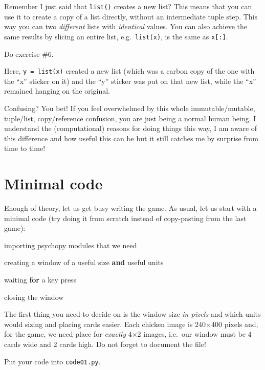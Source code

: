 \documentclass[
]{book}
\newenvironment{Shaded}{\begin{snugshade}}{\end{snugshade}}
\newcommand{\ControlFlowTok}[1]{\textcolor[rgb]{0.13,0.29,0.53}{\textbf{#1}}}
\newcommand{\KeywordTok}[1]{\textcolor[rgb]{0.13,0.29,0.53}{\textbf{#1}}}
\newcommand{\NormalTok}[1]{#1}
\begin{document}
Remember I just said that \texttt{list()} creates a new list? This means that you can use it to create a copy of a list directly, without an intermediate tuple step. This way you can two \emph{different} lists with \emph{identical} values. You can also achieve the same results by slicing an entire list, e.g.~\texttt{list(x)}, is the same as \texttt{x{[}:{]}}.

Do exercise \#6.

Here, \texttt{y\ =\ list(x)} created a new list (which was a carbon copy of the one with the ``x'' sticker on it) and the ``y'' sticker was put on that new list, while the ``x'' remained hanging on the original.

Confusing? You bet! If you feel overwhelmed by this whole immutable/mutable, tuple/list, copy/reference confusion, you are just being a normal human being. I understand the (computational) reasons for doing things this way, I am aware of this difference and how useful this can be but it still catches me by surprise from time to time!

\hypertarget{minimal-code}{%
\section{Minimal code}\label{minimal-code}}

Enough of theory, let us get busy writing the game. As usual, let us start with a minimal code (try doing it from scratch instead of copy-pasting from the last game):

\begin{Shaded}
\begin{Highlighting}[]
\NormalTok{importing psychopy modules that we need}
 
\NormalTok{creating a window of a useful size }\KeywordTok{and}\NormalTok{ useful units}

\NormalTok{waiting }\ControlFlowTok{for}\NormalTok{ a key press}

\NormalTok{closing the window}
\end{Highlighting}
\end{Shaded}

The first thing you need to decide on is the window size \emph{in pixels} and which units would sizing and placing cards easier. Each chicken image is 240×400 pixels and, for the game, we need place for \emph{exactly} 4×2 images, i.e.~our window must be 4 cards wide and 2 cards high. Do not forget to document the file!

Put your code into \texttt{code01.py}.
\end{document}

